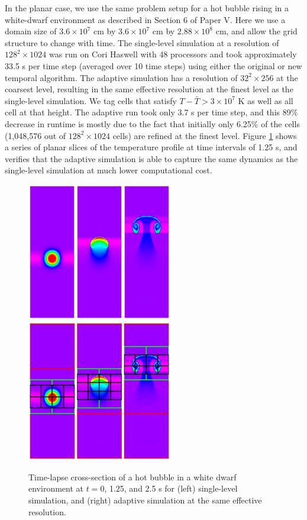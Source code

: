 In the planar case, we use the same problem setup for a hot bubble rising in a white-dwarf environment as described in Section 6 of Paper V. Here we use a domain size of $3.6\times 10^7$ cm by $3.6\times 10^7$ cm by $2.88\times 10^8$ cm, and allow the grid structure to change with time. The single-level simulation at a resolution of $128^2 \times 1024$ was run on Cori Haswell with 48 processors and took approximately 33.5 s per time step (averaged over 10 time steps) using either the original or new temporal algorithm. The adaptive simulation has a resolution of $32^2 \times 256$ at the coarsest level, resulting in the same effective resolution at the finest level as the single-level simulation. We tag cells that satisfy $T-\bar{T} > 3\times 10^7$ K as well as all cell at that height. The adaptive run took only 3.7 s per time step, and this 89\% decrease in runtime is mostly due to the fact that initially only 6.25\% of the cells (1,048,576 out of $128^2 \times 1024$ cells) are refined at the finest level. Figure \ref{fig:bubble_results} shows a series of planar slices of the temperature profile at time intervals of 1.25 s, and verifies that the adaptive simulation is able to capture the same dynamics as the single-level simulation at much lower computational cost. 

\begin{figure}[htb]
\begin{center}
\includegraphics[width=2.5in]{./figs/reacting_bubble_result} \hspace{2.5em}
\includegraphics[width=2.5in]{./figs/reacting_bubble_amr_result}
\caption{\label{fig:bubble_results} Time-lapse cross-section of a hot bubble in a white dwarf environment at 
         $t = 0$, 1.25, and 2.5 s for (left) single-level simulation, and 
         (right) adaptive simulation at the same effective resolution.}
\end{center}
\end{figure}

